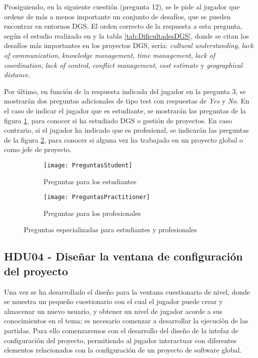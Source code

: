 Prosiguiendo, en la siguiente cuestión (pregunta 12), se le pide al jugador que ordene de más a menos importante un conjunto de desafíos, que se pueden encontrar en entornos DGS. El orden correcto de la respuesta a esta pregunta, según el estudio realizado en \cite{niazi2016challenges} y la tabla \ref{tab:DificultadesDGS}, donde se citan los desafíos más importantes en los proyectos DGS, sería: \emph{cultural understanding}, \emph{lack of communication}, \emph{knowledge management}, \emph{time management}, \emph{lack of coordination}, \emph{lack of control}, \emph{conflict management}, \emph{cost estimate} y \emph{geographical distance}.

Por último, en función de la respuesta indicada del jugador en la pregunta 3, se mostrarán dos preguntas adicionales de tipo test con respuestas de \emph{Yes} y \emph{No}. En el caso de indicar el jugador que es estudiante, se mostrarán las preguntas de la figura \ref{fig:PreguntasStudent}, para conocer si ha estudiado DGS o gestión de proyectos. En caso contrario, si el jugador ha indicado que es profesional, se indicarán las preguntas de la figura \ref{fig:PreguntasPractitioner}, para conocer si alguna vez ha trabajado en un proyecto global o como jefe de proyecto.

\begin{figure}[htb]
	\centering
	\begin{subfigure}[b]{1\linewidth}
		\centering
		\texttt{[image: PreguntasStudent]}
		\caption{Preguntas para los estudiantes}\label{fig:PreguntasStudent}
	\end{subfigure}
	\begin{subfigure}[b]{1\linewidth}
		\centering
		\texttt{[image: PreguntasPractitioner]}
		\caption{Preguntas para los profesionales}\label{fig:PreguntasPractitioner}
	\end{subfigure}
	\caption[Preguntas especializadas para estudiantes y profesionales]{Preguntas especializadas para estudiantes y profesionales}
	\label{fig:PreguntasAdicionales}
\end{figure}

\subsection{HDU04 - Diseñar la ventana de configuración del proyecto}
\label{sec:HDU04}

Una vez se ha desarrollado el diseño para la ventana cuestionario de nivel, donde se muestra un pequeño cuestionario con el cual el jugador puede crear y almacenar un nuevo usuario, y obtener un nivel de jugador acorde a sus conocimientos en el tema; es necesario comenzar a desarrollar la ejecución de las partidas. Para ello comenzaremos con el desarrollo del diseño de la intefaz de configuración del proyecto, permitiendo al jugador interactuar con diferentes elementos relacionados con la configuración de un proyecto de software global.

